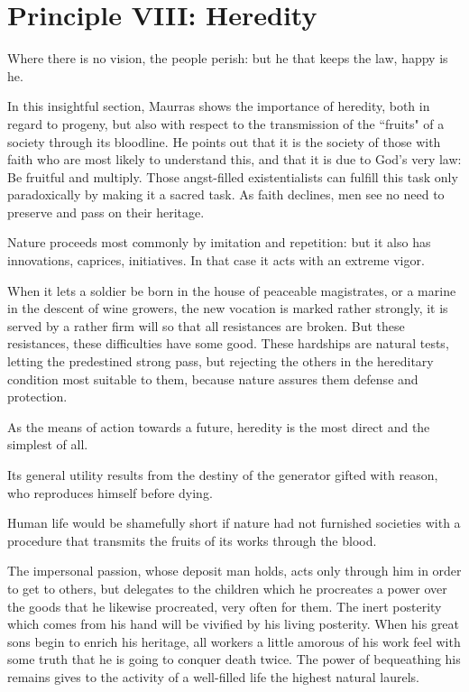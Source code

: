 \section{Principle VIII: Heredity}

\begin{quotex}
Where there is no vision, the people perish: but he that keeps the law, happy is he. 

In this insightful section, Maurras shows the importance of heredity, both in regard to progeny, but also with respect to the transmission of the ``fruits" of a society through its bloodline. He points out that it is the society of those with faith who are most likely to understand this, and that it is due to God's very law: Be fruitful and multiply. Those angst-filled existentialists can fulfill this task only paradoxically by making it a sacred task. As faith declines, men see no need to preserve and pass on their heritage. 

\end{quotex}
Nature proceeds most commonly by imitation and repetition: but it also has innovations, caprices, initiatives. In that case it acts with an extreme vigor.

When it lets a soldier be born in the house of peaceable magistrates, or a marine in the descent of wine growers, the new vocation is marked rather strongly, it is served by a rather firm will so that all resistances are broken. But these resistances, these difficulties have some good. These hardships are natural tests, letting the predestined strong pass, but rejecting the others in the hereditary condition most suitable to them, because nature assures them defense and protection.

As the means of action towards a future, heredity is the most direct and the simplest of all.

Its general utility results from the destiny of the generator gifted with reason, who reproduces himself before dying.

Human life would be shamefully short if nature had not furnished societies with a procedure that transmits the fruits of its works through the blood.

The impersonal passion, whose deposit man holds, acts only through him in order to get to others, but delegates to the children which he procreates a power over the goods that he likewise procreated, very often for them. The inert posterity which comes from his hand will be vivified by his living posterity. When his great sons begin to enrich his heritage, all workers a little amorous of his work feel with some truth that he is going to conquer death twice. The power of bequeathing his remains gives to the activity of a well-filled life the highest natural laurels.

